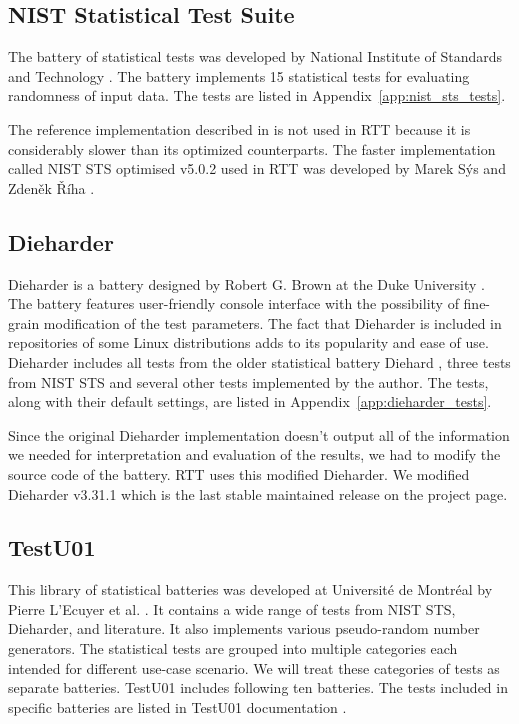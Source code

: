 \documentclass[
	digital,    %
	oneside,    %
	color,
	11pt,
	nocover,
	notable,
	nolof,
	nolot,
]{fithesis3}
\theoremstyle{definition}
\theoremstyle{remark}
\begin{document}
\subsection{NIST Statistical Test Suite}
The battery of statistical tests was developed by National Institute of Standards and Technology \cite{nist-sts}. The battery implements 15 statistical tests for evaluating randomness of input data. The tests are listed in Appendix~\ref{app:nist_sts_tests}.

The reference implementation described in \cite{nist-sts-documentation} is not used in RTT because it is considerably slower than its optimized counterparts. The faster implementation called NIST STS optimised v5.0.2 used in RTT was developed by Marek Sýs and Zdeněk Říha \cite{nist-sts-syso-optimization}.

\subsection{Dieharder}
Dieharder is a battery designed by Robert G. Brown at the Duke University \cite{dieharder}. The battery features user-friendly console interface with the possibility of fine-grain modification of the test parameters. The fact that Dieharder is included in repositories of some Linux distributions \cite{dieharder-manpage} adds to its popularity and ease of use. Dieharder includes all tests from the older statistical battery Diehard \cite{diehard}, three tests from NIST STS and several other tests implemented by the author. The tests, along with their default settings, are listed in Appendix~\ref{app:dieharder_tests}.

Since the original Dieharder implementation doesn't output all of the information we needed for interpretation and evaluation of the results, we had to modify the source code of the battery. RTT uses this modified Dieharder. We modified Dieharder v3.31.1 which is the last stable maintained release on the project page.

\subsection{TestU01}
This library of statistical batteries was developed at Université de Montréal by Pierre L’Ecuyer et al. \cite{testu01-paper}. It contains a wide range of tests from NIST STS, Dieharder, and literature. It also implements various pseudo-random number generators. The statistical tests are grouped into multiple categories each intended for different use-case scenario. We will treat these categories of tests as separate batteries. TestU01 includes following ten batteries. The tests included in specific batteries are listed in TestU01 documentation \cite{testu01-documentation}.
\end{document}
